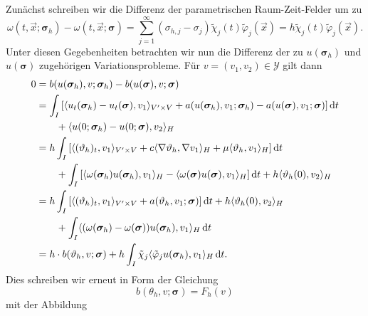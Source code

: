 \documentclass[../main.tex]{subfiles}
\begin{document}
\begin{Satz}
\begin{Beweis}
        Zunächst schreiben wir die Differenz der parametrischen Raum-Zeit-Felder um zu
        \begin{equation}
            \omega(t, \vec{x}; \bm\sigma_{h}) - \omega(t, \vec{x}; \bm\sigma)
            = \sum_{j = 1}^{\infty} (\sigma_{h,j} - \sigma_{j} ) \tilde{\chi}_{j}(t) \tilde{\varphi}_{j}(\vec{x})
            = h \tilde{\chi}_{j}(t) \tilde{\varphi}_{j}(\vec{x}).
        \end{equation}
        Unter diesen Gegebenheiten betrachten wir nun die Differenz der zu $u(\bm\sigma_{h})$ und $u(\bm\sigma)$ zugehörigen Variationsprobleme.
        Für $v = (v_{1}, v_{2}) \in \mathcal Y$ gilt dann
        \begin{align}
            0
            &= b(u(\bm\sigma_{h}), v; \bm\sigma_{h}) - b(u(\bm\sigma), v; \bm\sigma)
            \\&= \int_{I} \left[ \langle u_{t}(\bm\sigma_{h}) - u_{t}(\bm\sigma),v_{1}\rangle_{V' \times V} + a(u(\bm\sigma_{h}), v_{1}; \bm\sigma_{h}) - a(u(\bm\sigma), v_{1}; \bm\sigma) \right] \mathop{}\!\mathrm{d} t
            \\&\qquad + \langle u(0; \bm\sigma_{h}) - u(0; \bm\sigma),v_{2}\rangle_{H}
            \\&=  h \int_{I} \left[ \langle(\vartheta_{h})_{t},v_{1}\rangle_{V' \times V} + c\langle\nabla \vartheta_{h},\nabla v_{1}\rangle_{H}  +  \mu \langle\vartheta_{h},v_{1}\rangle_{H} \right] \mathop{}\!\mathrm{d} t
            \\&\qquad + \int_{I} \left[ \langle\omega(\bm\sigma_{h}) u(\bm\sigma_{h}),v_{1}\rangle_{H} - \langle\omega(\bm\sigma) u(\bm\sigma),v_{1}\rangle_{H}  \right] \mathop{}\!\mathrm{d} t + h \langle\vartheta_{h}(0),v_{2}\rangle_{H}
            \\&= h \int_{I} \left[ \langle(\vartheta_{h})_{t},v_{1}\rangle_{V' \times V} + a(\vartheta_{h}, v_{1}; \bm\sigma)  \right] \mathop{}\!\mathrm{d} t + h \langle\vartheta_{h}(0),v_{2}\rangle_{H}
            \\&\qquad +\int_{I} \langle(\omega(\bm\sigma_{h}) - \omega(\bm\sigma))u(\bm\sigma_{h}),v_{1}\rangle_{H} \mathop{}\!\mathrm{d} t
            \\&= h \cdot b(\vartheta_{h}, v; \bm\sigma) + h \int_{I} \tilde{\chi}_{j} \langle\tilde{\varphi}_{j} u(\bm\sigma_{h}),v_{1}\rangle_{H} \mathop{}\!\mathrm{d} t.
        \end{align}
        Dies schreiben wir erneut in Form der Gleichung
        \begin{equation}
            \label{eq:existenz_partieller_ableitungen:beweis:variationsproblem}
            b(\theta_{h}, v; \bm\sigma) = F_{h}(v)
        \end{equation}
        mit der Abbildung
        \begin{equation}

\end{equation}
\end{Beweis}
\end{Satz}
\end{document}
